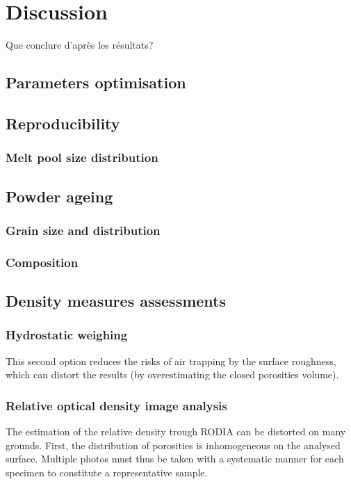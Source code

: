 \chapter{Discussion}
\label{Chap5}
Que conclure d'après les résultats?

\section{Parameters optimisation}

\section{Reproducibility}

\subsection{Melt pool size distribution}


\section{Powder ageing}
\subsection{Grain size and distribution}


\subsection{Composition}

\section{Density measures assessments}
\subsection{Hydrostatic weighing}

This second option reduces the risks of air trapping by the surface roughness, which can distort the results (by overestimating the closed porosities volume). %

\subsection{Relative optical density image analysis}
The estimation of the relative density trough RODIA can be distorted on many grounds. First, the distribution of porosities is inhomogeneous on the analysed surface. Multiple photos must thus be taken with a systematic manner for each specimen to constitute a representative sample.\\

